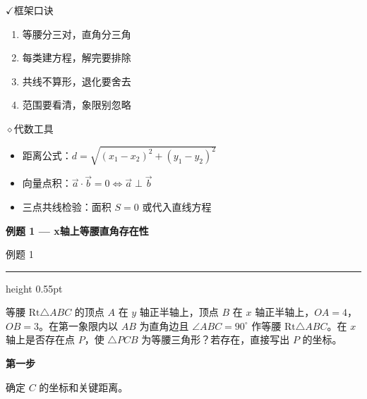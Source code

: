 \documentclass{exam-zh}
\newcommand{\eduSectionTitle}[1]{%
  \needspace{5\baselineskip}%
  \vspace{2mm}
  {\color{edu-blue}\bfseries\large #1}\par
  \vspace{3mm}
}
\newenvironment{eduSubQuestionItem}[1]{%
  \needspace{4\baselineskip}%
  \vspace{2mm}
  \par\noindent
  \hangindent=8mm\hangafter=1
  {\color{edu-blue}\bfseries #1}\enspace
  \begingroup
  \color{edu-ink}
}{%
  \endgroup
  \par
  \vspace{3mm}
}
\newcommand{\eduIconCheck}{\(\checkmark\)}
\newcommand{\eduIconPin}{\(\diamond\)}
\newenvironment{eduProblemBlock}[1][题目]{%
  \needspace{8\baselineskip}
  {\small\color{edu-muted}#1}\par
  \vspace{1.5mm}
  {\color{edu-blue}\hrule height 0.55pt}
  \vspace{4.5mm}
  \begingroup
  \color{edu-ink}
  \large
  \setlength{\parskip}{2.2mm}
  \linespread{1.20}\selectfont
}{%
  \par
  \endgroup
  \vspace{6mm}
}
\newenvironment{eduBulletList}{%
  \begin{itemize}[
    label=\textbullet,
    leftmargin=5mm,
    itemsep=1.2mm,
    topsep=0pt,
    parsep=0pt
  ]
}{%
  \end{itemize}
}
\newenvironment{eduBottomGrid}{%
  \vspace{1mm}
  \par\noindent
}{%
  \par\vspace{1mm}
}
\newenvironment{eduSummaryLeft}{%
  \begin{minipage}[t]{0.30\linewidth}
}{%
  \end{minipage}
}
\newcommand{\eduSummaryDivider}{%
  \hspace{4mm}{\color{edu-line}\vrule width 0.35pt}\hspace{7mm}%
}
\newenvironment{eduSummaryRight}{%
  \begin{minipage}[t]{0.58\linewidth}
}{%
  \end{minipage}
}
\newenvironment{eduPlainList}{%
  \begin{enumerate}[
    label=(\arabic*),
    leftmargin=7mm,
    itemsep=1.2mm,
    topsep=0pt,
    parsep=0pt
  ]
}{%
  \end{enumerate}
}
\begin{document}
\begin{eduBottomGrid}
  \begin{eduSummaryLeft}
    \begin{eduSummaryBlock}{\eduIconCheck}{框架口诀}
    \begin{eduPlainList}
      \item 等腰分三对，直角分三角      \item 每类建方程，解完要排除      \item 共线不算形，退化要舍去      \item 范围要看清，象限别忽略    \end{eduPlainList}
    \end{eduSummaryBlock}
  \end{eduSummaryLeft}
  \eduSummaryDivider
  \begin{eduSummaryRight}
    \begin{eduSummaryBlock}{\eduIconPin}{代数工具}
    \begin{eduBulletList}
      \item 距离公式：$d = \sqrt{(x_1-x_2)^2+(y_1-y_2)^2}$      \item 向量点积：$\vec{a}\cdot\vec{b} = 0 \Leftrightarrow \vec{a} \perp \vec{b}$      \item 三点共线检验：面积 $S = 0$ 或代入直线方程    \end{eduBulletList}
    \end{eduSummaryBlock}
  \end{eduSummaryRight}
\end{eduBottomGrid}



\eduSectionTitle{例题 1 — x轴上等腰直角存在性}

\begin{eduProblemBlock}[例题 1]
等腰 $\mathrm{Rt}\triangle ABC$ 的顶点 $A$ 在 $y$ 轴正半轴上，顶点 $B$ 在 $x$ 轴正半轴上，$OA=4$，$OB=3$。在第一象限内以 $AB$ 为直角边且 $\angle ABC = 90^\circ$ 作等腰 $\mathrm{Rt}\triangle ABC$。在 $x$ 轴上是否存在点 $P$，使 $\triangle PCB$ 为等腰三角形？若存在，直接写出 $P$ 的坐标。
\end{eduProblemBlock}









\begin{eduSubQuestionItem}{第一步}
确定 $C$ 的坐标和关键距离。\end{eduSubQuestionItem}
\end{document}
